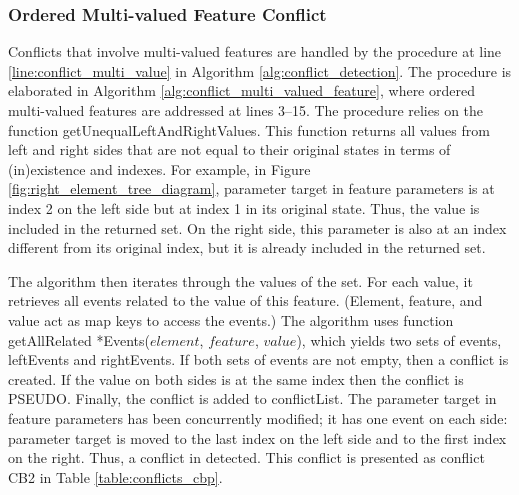 \subsubsection{Ordered Multi-valued Feature Conflict}
\label{sec:ordered_conflict}
Conflicts that involve multi-valued features are handled by the procedure at line \ref{line:conflict_multi_value} in Algorithm \ref{alg:conflict_detection}. The procedure is elaborated in Algorithm \ref{alg:conflict_multi_valued_feature}, where ordered multi-valued features are addressed at lines 3–15. The procedure relies on the function \textsf{getUnequalLeftAndRightValues}. This function returns all values from left and right sides that are not equal to their original states in terms of (in)existence and indexes. For example, in Figure \ref{fig:right_element_tree_diagram}, parameter \textsf{target} in feature \textsf{parameters} is at index 2 on the left side but at index 1 in its original state. Thus, the value is included in the returned set. On the right side, this parameter is also at an index different from its original index, but it is already included in the returned set.

The algorithm then iterates through the values of the set. For each value, it retrieves all events related to the value of this feature. (Element, feature, and value act as map keys to access the events.) The algorithm uses function \textsf{getAllRelated *Events($element$, $feature$, $value$)}, which yields two sets of events, \textsf{leftEvents} and \textsf{rightEvents}. If both sets of events are not empty, then a conflict is created. If the value on both sides is at the same index then the conflict is \textsf{PSEUDO}. Finally, the conflict is added to \textsf{conflictList}. The parameter \textsf{target} in feature \textsf{parameters} has been concurrently modified; it has one event on each side: parameter \textsf{target} is moved to the last index on the left side and to the first index on the right. Thus, a conflict in detected. This conflict is presented as conflict \textsf{CB2} in Table \ref{table:conflicts_cbp}.


